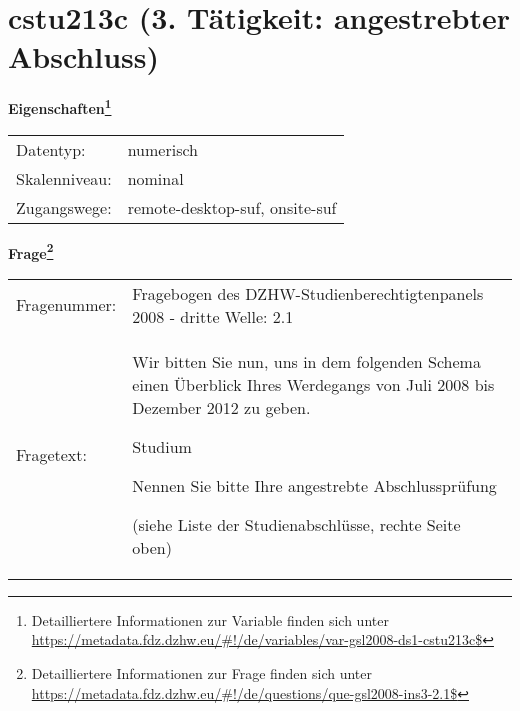 
    \setcounter{footnote}{0}

    \vspace*{-1.8cm}
	\section{cstu213c (3. Tätigkeit: angestrebter Abschluss)}
	\label{section:cstu213c}



    \vspace*{0.5cm}
    \noindent\textbf{Eigenschaften\footnote{Detailliertere Informationen zur Variable finden sich unter
		\url{https://metadata.fdz.dzhw.eu/\#!/de/variables/var-gsl2008-ds1-cstu213c$}}}\\
	\begin{tabularx}{\hsize}{@{}lX}
	Datentyp: & numerisch \\
	Skalenniveau: & nominal \\
	Zugangswege: &
	  remote-desktop-suf, 
	  onsite-suf
 \\
    \end{tabularx}



				\vspace*{0.5cm}
                \noindent\textbf{Frage\footnote{Detailliertere Informationen zur Frage finden sich unter
		              \url{https://metadata.fdz.dzhw.eu/\#!/de/questions/que-gsl2008-ins3-2.1$}}}\\
				\begin{tabularx}{\hsize}{@{}lX}
					Fragenummer: &
					  Fragebogen des DZHW-Studienberechtigtenpanels 2008 - dritte Welle:
					  2.1
 \\
					Fragetext: & Wir bitten Sie nun, uns in dem folgenden Schema einen Überblick Ihres Werdegangs von Juli 2008 bis Dezember 2012 zu geben.\par  Studium\par  Nennen Sie bitte Ihre angestrebte Abschlussprüfung \par  (siehe Liste der Studienabschlüsse, rechte Seite oben) \\
				\end{tabularx}





